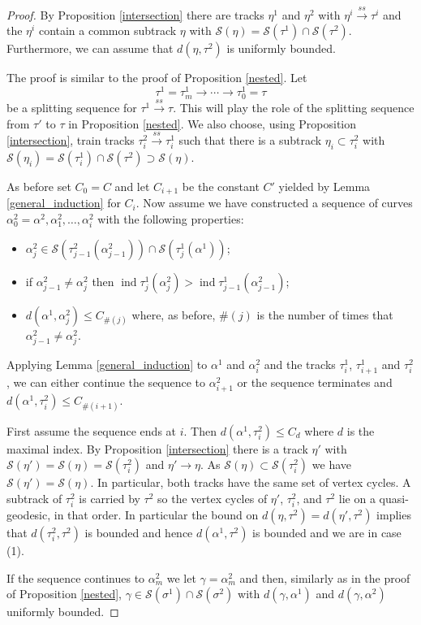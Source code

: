 \documentclass[11pt]{article}
\theoremstyle{remark}
\def\S{{\mathcal S}}
\def\ind{\operatorname{ind}}
\def\ss{{\overset{ss}\longrightarrow}}
\begin{document}
\begin{proof} By Proposition \ref{intersection} there are tracks $\eta^1$ and $\eta^2$ with $\eta^i \ss \tau^i$ and the $\eta^i$ contain a common subtrack $\eta$ with $\S(\eta) = \S(\tau^1) \cap \S(\tau^2)$. Furthermore, we can assume that $d(\eta, \tau^2)$ is uniformly bounded.


The proof is similar to the proof of Proposition \ref{nested}.
Let
$$\tau^1 = \tau^1_m \to \cdots \to \tau^1_0 = \tau$$
be a splitting sequence for $\tau^1 \ss \tau$. This will play the role of the splitting sequence from $\tau'$ to $\tau$ in Proposition \ref{nested}. We also choose, using Proposition \ref{intersection}, train tracks $\tau^2_i \ss \tau^1_i$ such that there is a subtrack $\eta_i \subset \tau^2_i$ with $\S(\eta_i) = \S(\tau^1_i) \cap \S(\tau^2)\supset \S(\eta)$.

As before set $C_0 = C$ and let $C_{i+1}$ be the constant $C'$ yielded by Lemma \ref{general_induction} for $C_i$. Now assume we have constructed a sequence of curves $\alpha^2_0 = \alpha^2, \alpha^2_1, \dots, \alpha_i^2$ with the following properties:
\begin{itemize}
\item $\alpha^2_j \in \S(\tau^2_{j-1}(\alpha^2_{j-1})) \cap \S(\tau^1_j(\alpha^1))$;

\item if $\alpha^2_{j-1} \neq \alpha^2_j$ then $\ind \tau^1_j(\alpha^2_j) > \ind \tau^1_{j-1}(\alpha^2_{j-1})$;

\item $d(\alpha^1, \alpha^2_j) \le C_{\#(j)}$ where, as before, $\#(j)$ is the number of times that $\alpha^2_{j-1} \neq \alpha^2_j$.


\end{itemize}
Applying Lemma \ref{general_induction} to $\alpha^1$ and $\alpha^2_i$ and the tracks $\tau^1_i$, $\tau^1_{i+1}$ and $\tau^2_i$, we can either continue the sequence to $\alpha^2_{i+1}$ or the sequence terminates and $d(\alpha^1, \tau^2_i) \le C_{\#(i+1)}$.

First assume the sequence ends at $i$. Then $d(\alpha^1, \tau^2_i)\le C_d$ where $d$ is the maximal index. 
By Proposition \ref{intersection} there is a track $\eta'$ with $\S(\eta') = \S(\eta) = \S(\tau_i^2)$ and $\eta' \to \eta$. As $\S(\eta) \subset \S(\tau^2_i)$ we have $\S(\eta') = \S(\eta)$. In particular, both tracks have the same set of vertex cycles.
A subtrack of $\tau^2_i$ is carried by $\tau^2$ so the vertex cycles of $\eta'$, $\tau^2_i$, and $\tau^2$ lie on a quasi-geodesic, in that order. In particular the bound on $d(\eta, \tau^2) = d(\eta', \tau^2)$ implies that $d(\tau^2_i, \tau^2)$ is bounded and hence $d(\alpha^1, \tau^2)$ is bounded and we are in case (1).

If the sequence continues to $\alpha^2_m$ we let $\gamma = \alpha^2_m$ and then, similarly as in the proof of Proposition \ref{nested}, $\gamma \in \S(\sigma^1) \cap \S(\sigma^2)$ with $d(\gamma, \alpha^1)$ and $d(\gamma,\alpha^2)$ uniformly bounded.
\end{proof}
\end{document}
